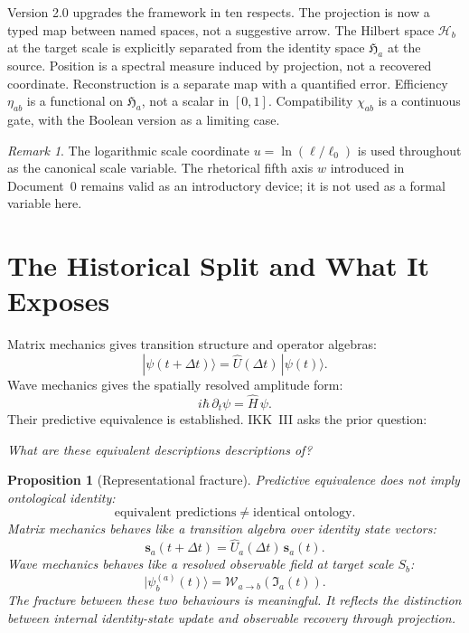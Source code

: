 \documentclass[12pt, a4paper]{article}
\theoremstyle{definition}
\theoremstyle{plain}
\newtheorem{prop}{Proposition}[section]
\theoremstyle{remark}
\newtheorem{remark}{Remark}[section]
\newcommand{\Ia}{\mathfrak{I}_a}
\newcommand{\Ha}{\mathfrak{H}_a}        %
\newcommand{\Hb}{\mathcal{H}_b}         %
\newcommand{\Sb}{S_b}
\newcommand{\Wab}{\mathcal{W}_{a\to b}}   %
\newcommand{\sa}{\mathbf{s}_a}
\newcommand{\Ua}{\hat{U}_a}
\newcommand{\Hhat}{\hat{H}}
\newcommand{\Uhat}{\hat{U}}
\newcommand{\chiab}{\chi_{ab}}
\newcommand{\etaab}{\eta_{ab}}
\newcommand{\uscl}{u}
\begin{document}
Version 2.0 upgrades the framework in ten respects.
The projection is now a typed map between named spaces, not a
suggestive arrow.
The Hilbert space $\Hb$ at the target scale is explicitly separated
from the identity space $\Ha$ at the source.
Position is a spectral measure induced by projection, not a
recovered coordinate.
Reconstruction is a separate map with a quantified error.
Efficiency $\etaab$ is a functional on $\Ha$, not a scalar in $[0,1]$.
Compatibility $\chiab$ is a continuous gate, with the Boolean version
as a limiting case.

\begin{remark}
The logarithmic scale coordinate $\uscl = \ln(\ell/\ell_0)$ is used
throughout as the canonical scale variable.
The rhetorical fifth axis $w$ introduced in Document~0 remains valid
as an introductory device; it is not used as a formal variable here.
\end{remark}


\section{The Historical Split and What It Exposes}
\label{sec:history}

Matrix mechanics gives transition structure and operator algebras:
\[
  |\psi(t+\Delta t)\rangle = \Uhat(\Delta t)\,|\psi(t)\rangle.
\]
Wave mechanics gives the spatially resolved amplitude form:
\[
  i\hbar\,\partial_t\psi = \Hhat\,\psi.
\]
Their predictive equivalence is established.
IKK~III asks the prior question:

\begin{center}
\textit{What are these equivalent descriptions descriptions of?}
\end{center}

\begin{prop}[Representational fracture]
\label{prop:fracture}
Predictive equivalence does not imply ontological identity:
\[
  \text{equivalent predictions} \;\neq\; \text{identical ontology.}
\]
Matrix mechanics behaves like a transition algebra over identity
state vectors:
\[
  \sa(t+\Delta t) = \Ua(\Delta t)\,\sa(t).
\]
Wave mechanics behaves like a resolved observable field at target
scale $\Sb$:
\[
  |\psi_b^{(a)}(t)\rangle = \Wab(\Ia(t)).
\]
The fracture between these two behaviours is meaningful.
It reflects the distinction between internal identity-state update
and observable recovery through projection.
\end{prop}
\end{document}
